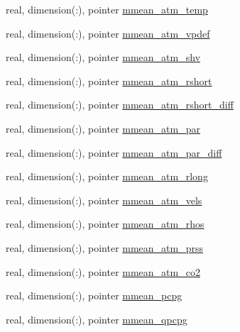 \begin{DoxyCompactItemize}
\item 
real, dimension(\+:), pointer \hyperlink{structed__state__vars_1_1polygontype_a322e2ab8a52595d3ce8ecd298d257cf4}{mmean\+\_\+atm\+\_\+temp}
\item 
real, dimension(\+:), pointer \hyperlink{structed__state__vars_1_1polygontype_a1285295e8506fa14bc54d18725083879}{mmean\+\_\+atm\+\_\+vpdef}
\item 
real, dimension(\+:), pointer \hyperlink{structed__state__vars_1_1polygontype_a4ddf4d522cc3be567aa3c99b57652647}{mmean\+\_\+atm\+\_\+shv}
\item 
real, dimension(\+:), pointer \hyperlink{structed__state__vars_1_1polygontype_a08e2ecabe2c57c056513a5e3a288194e}{mmean\+\_\+atm\+\_\+rshort}
\item 
real, dimension(\+:), pointer \hyperlink{structed__state__vars_1_1polygontype_ae9bc5345874e77329585d87a723d30f8}{mmean\+\_\+atm\+\_\+rshort\+\_\+diff}
\item 
real, dimension(\+:), pointer \hyperlink{structed__state__vars_1_1polygontype_a148eb329c9085b230496fdce23d8b2d4}{mmean\+\_\+atm\+\_\+par}
\item 
real, dimension(\+:), pointer \hyperlink{structed__state__vars_1_1polygontype_a27109ae4858c4cb2487607d9fe8fa268}{mmean\+\_\+atm\+\_\+par\+\_\+diff}
\item 
real, dimension(\+:), pointer \hyperlink{structed__state__vars_1_1polygontype_a9b7777264c529624ff9806315c61d57c}{mmean\+\_\+atm\+\_\+rlong}
\item 
real, dimension(\+:), pointer \hyperlink{structed__state__vars_1_1polygontype_aca492edf16af6790d96119d3922410dd}{mmean\+\_\+atm\+\_\+vels}
\item 
real, dimension(\+:), pointer \hyperlink{structed__state__vars_1_1polygontype_afe8a9893d9da8922bdef8652806ec232}{mmean\+\_\+atm\+\_\+rhos}
\item 
real, dimension(\+:), pointer \hyperlink{structed__state__vars_1_1polygontype_a97a16075631e7aea151d0bcff9e9d8b7}{mmean\+\_\+atm\+\_\+prss}
\item 
real, dimension(\+:), pointer \hyperlink{structed__state__vars_1_1polygontype_a09fb83c604b79ad1da464810f5df87f7}{mmean\+\_\+atm\+\_\+co2}
\item 
real, dimension(\+:), pointer \hyperlink{structed__state__vars_1_1polygontype_aa6c2e49e11e91563b01260b9b962e021}{mmean\+\_\+pcpg}
\item 
real, dimension(\+:), pointer \hyperlink{structed__state__vars_1_1polygontype_ae626b95d1baa15cc71d3cd33959054c6}{mmean\+\_\+qpcpg}

\end{DoxyCompactItemize}

